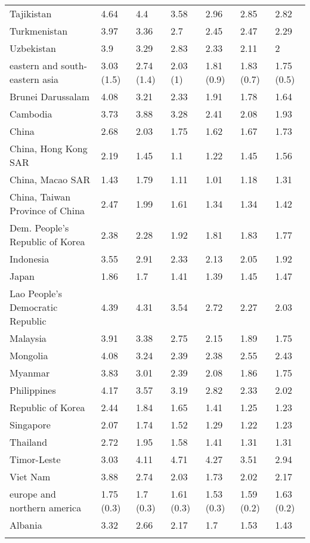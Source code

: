 \begin{longtable}[t]{lllllll}
Tajikistan & 4.64 & 4.4 & 3.58 & 2.96 & 2.85 & 2.82\\
Turkmenistan & 3.97 & 3.36 & 2.7 & 2.45 & 2.47 & 2.29\\
Uzbekistan & 3.9 & 3.29 & 2.83 & 2.33 & 2.11 & 2\\
eastern and south-eastern asia & 3.03 (1.5) & 2.74 (1.4) & 2.03 (1) & 1.81 (0.9) & 1.83 (0.7) & 1.75 (0.5)\\
Brunei Darussalam & 4.08 & 3.21 & 2.33 & 1.91 & 1.78 & 1.64\\
\addlinespace
Cambodia & 3.73 & 3.88 & 3.28 & 2.41 & 2.08 & 1.93\\
China & 2.68 & 2.03 & 1.75 & 1.62 & 1.67 & 1.73\\
China, Hong Kong SAR & 2.19 & 1.45 & 1.1 & 1.22 & 1.45 & 1.56\\
China, Macao SAR & 1.43 & 1.79 & 1.11 & 1.01 & 1.18 & 1.31\\
China, Taiwan Province of China & 2.47 & 1.99 & 1.61 & 1.34 & 1.34 & 1.42\\
\addlinespace
Dem. People's Republic of Korea & 2.38 & 2.28 & 1.92 & 1.81 & 1.83 & 1.77\\
Indonesia & 3.55 & 2.91 & 2.33 & 2.13 & 2.05 & 1.92\\
Japan & 1.86 & 1.7 & 1.41 & 1.39 & 1.45 & 1.47\\
Lao People's Democratic Republic & 4.39 & 4.31 & 3.54 & 2.72 & 2.27 & 2.03\\
Malaysia & 3.91 & 3.38 & 2.75 & 2.15 & 1.89 & 1.75\\
\addlinespace
Mongolia & 4.08 & 3.24 & 2.39 & 2.38 & 2.55 & 2.43\\
Myanmar & 3.83 & 3.01 & 2.39 & 2.08 & 1.86 & 1.75\\
Philippines & 4.17 & 3.57 & 3.19 & 2.82 & 2.33 & 2.02\\
Republic of Korea & 2.44 & 1.84 & 1.65 & 1.41 & 1.25 & 1.23\\
Singapore & 2.07 & 1.74 & 1.52 & 1.29 & 1.22 & 1.23\\
\addlinespace
Thailand & 2.72 & 1.95 & 1.58 & 1.41 & 1.31 & 1.31\\
Timor-Leste & 3.03 & 4.11 & 4.71 & 4.27 & 3.51 & 2.94\\
Viet Nam & 3.88 & 2.74 & 2.03 & 1.73 & 2.02 & 2.17\\
europe and northern america & 1.75 (0.3) & 1.7 (0.3) & 1.61 (0.3) & 1.53 (0.3) & 1.59 (0.2) & 1.63 (0.2)\\
Albania & 3.32 & 2.66 & 2.17 & 1.7 & 1.53 & 1.43\\
\addlinespace

\end{longtable}
